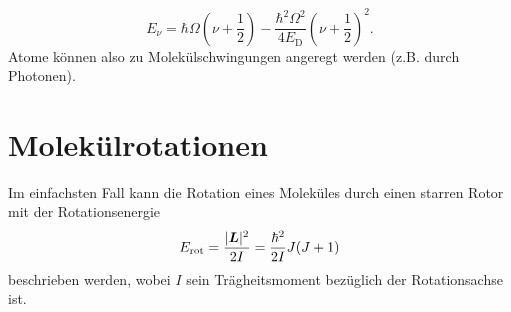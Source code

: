 \begin{equation*}
	E_\nu = \hbar\Omega\left(\nu+\frac{1}{2}\right) - \frac{\hbar^2\Omega^2}{4E_\text{D}}\left(\nu+\frac{1}{2}\right)^2.
\end{equation*}
Atome können also zu Molekülschwingungen angeregt werden (z.B. durch Photonen).

\section{Molekülrotationen}
Im einfachsten Fall kann die Rotation eines Moleküles durch einen starren Rotor mit der Rotationsenergie
\begin{equation*}
	E_\text{rot} = \frac{|\boldsymbol{L}|^2}{2I} = \frac{\hbar^2}{2I}J(J+1)
\end{equation*}
beschrieben werden, wobei $I$ sein Trägheitsmoment bezüglich der Rotationsachse ist.
